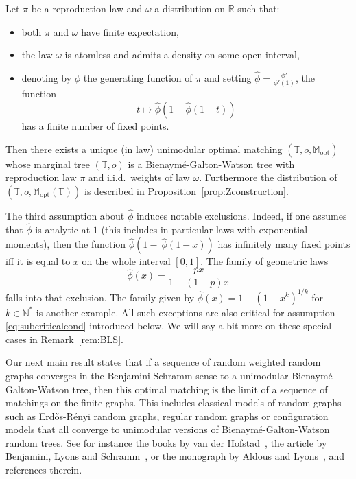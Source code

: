 \documentclass[11pt]{article}
\begin{document}
\begin{theorem}\label{maintheorem}
    Let $\pi$ be a  reproduction law and $\omega$ a distribution on $\mathbb{R}$ such that:
    \begin{itemize}
        \item both $\pi$ and $\omega$ have finite expectation,
        \item the law $\omega$ is atomless and admits a density on some open interval,
        \item denoting by $\phi$ the generating function of $\pi$ and setting $\hat{\phi}= \frac{\phi'}{\phi'(1)}$, the function
        \[t \mapsto \hat{\phi}(1-\hat{\phi}(1-t))\]
        has a finite number of fixed points.
    \end{itemize}
    Then there exists a unique (in law) unimodular optimal matching $(\mathbb{T},o,\mathbb{M}_{\mathrm{opt}})$ whose marginal tree $(\mathbb{T},{o})$ is a Bienaymé-Galton-Watson tree with reproduction law $\pi$ and i.i.d.~weights of law $\omega$. Furthermore the distribution of $(\mathbb{T},{o},\mathbb{M}_{\mathrm{opt}}(\mathbb{T}))$ is described in Proposition~\ref{prop:Zconstruction}.
\end{theorem}

\begin{remark} \label{rem:exceptions}
    The third assumption about $\hat \phi$ induces notable exclusions. Indeed, if one assumes that $\hat \phi$ is analytic at $1$ (this includes in particular laws with exponential moments), then the function $\hat\phi ( 1- \ \hat{\phi} (1-x))$ has infinitely many fixed points iff it is equal to $x$ on the whole interval $[0,1]$. The family of geometric laws
    \[
    \hat \phi (x) = \frac{px}{1-(1-p)x}
    \]
    falls into that exclusion. The family given by $\hat \phi (x) = 1-(1-x^k)^{1/k}$ for $k \in \mathbb N^*$ is another example. All such exceptions are also critical for assumption \eqref{eq:subcriticalcond} introduced below. We will say a bit more on these special cases in Remark~\ref{rem:BLS}.
\end{remark}

Our next main result states that if a sequence of random weighted random graphs converges in the Benjamini-Schramm sense to a unimodular Bienaymé-Galton-Watson tree, then this optimal matching is the limit of a sequence of matchings on the finite graphs. This includes classical models of random graphs such as Erd\H{o}s-R\'enyi random graphs, regular random graphs or configuration models that all converge to unimodular versions of Bienaymé-Galton-Watson random trees. See for instance the books by van der Hofstad~\cite{vanderHofstad1,vanderHofstadBook2}, the article by Benjamini, Lyons and Schramm~\cite{BENJAMINI_LYONS_SCHRAMM_2015}, or the monograph by Aldous and Lyons~\cite{aldous2018processes}, and references therein.
\end{document}
